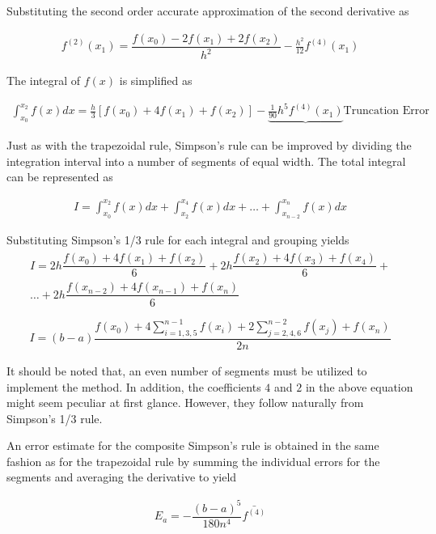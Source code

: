 \documentclass[book.tex]{subfiles}
\begin{document}
Substituting the second order accurate approximation of the second derivative as 

\begin{align}
f^{(2)}(x_1) = \dfrac{f(x_0) - 2f(x_1) + 2f(x_2)}{h^2} - \frac{h^2}{12}f^{(4)}(x_1)
\end{align}

The integral of $f(x)$ is simplified as

\begin{align}
\int_{x_0}^{x_2}f(x)dx =  \frac{h}{3}[f(x_0) + 4f(x_1) + f(x_2)] - \underbrace{\frac{1}{90}h^5f^{(4)}(x_1)}{\text{Truncation Error}}
\end{align}

Just as with the trapezoidal rule, Simpson's rule can be improved by dividing the integration interval into a number of segments of equal width. The total integral can be represented as

\begin{align}
I = \int_{x_0}^{x_2} f(x) dx + \int_{x_2}^{x_4} f(x) dx + \dotsc + \int_{x_{n-2}}^{x_n} f(x) dx
\end{align}

Substituting Simpson's 1/3 rule for each integral and grouping yields
\begin{align}
\begin{split}
I = 2h\dfrac{f(x_0) + 4f(x_1) + f(x_2)}{6} + 2h\dfrac{f(x_2) + 4f(x_3) + f(x_4)}{6} + \\
\dotsc + 2h\dfrac{f(x_{n-2}) + 4f(x_{n-1}) + f(x_n)}{6}\\
\end{split}
\end{align}
\begin{align}
I = (b-a)\dfrac{f(x_0) + 4\sum_{i=1,3,5}^{n-1}f(x_i) + 2\sum_{j=2,4,6}^{n-2}f(x_j) + f(x_n)}{2n}
\end{align}

It should be noted that, an even number of segments must be utilized to implement the method. In addition, the coefficients $4$ and $2$ in the above equation might
seem peculiar at first glance. However, they follow naturally from Simpson's 1/3 rule.

An error estimate for the composite Simpson's rule is obtained in the same fashion as for the trapezoidal rule by summing the individual errors for the segments and averaging the derivative to yield

\begin{align}
E_a = -\dfrac{(b-a)^5}{180n^4}\bar{f^{(4)}}
\end{align}
\end{document}
